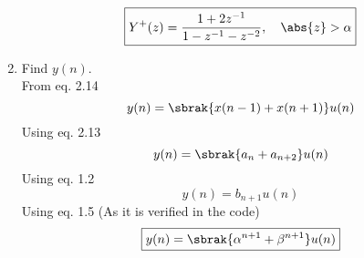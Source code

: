 \documentclass[journal,12pt,twocolumn]{IEEEtran}
\renewcommand\thesection{\arabic{section}}
\begin{document}
\begin{enumerate}[label=\thesection.\arabic*,ref=\thesection.\theenumi]
\begin{equation}
	\boxed{Y^{+}(z) = \frac{1 + 2z^{-1}}{1 - z^{-1} - z^{-2}}, \quad \abs{z} > \alpha}
\end{equation}
\item Find $y(n)$.\\
\solution
From eq. 2.14
\begin{equation}
	y(n) = \sbrak{x(n -1) + x(n + 1)}u(n)
\end{equation}
Using eq. 2.13
\begin{equation}
	y(n) = \sbrak{a_n + a_{n + 2}}u(n)
\end{equation}
Using eq. 1.2
\begin{equation}
	y(n) = b_{n + 1}u(n)
\end{equation}
Using eq. 1.5 (As it is verified in the code)
\begin{equation}
	\boxed{y(n) = \sbrak{{\alpha}^{n + 1} + {\beta}^{n + 1}}u(n)}
\end{equation}
\end{enumerate}
\end{document}
